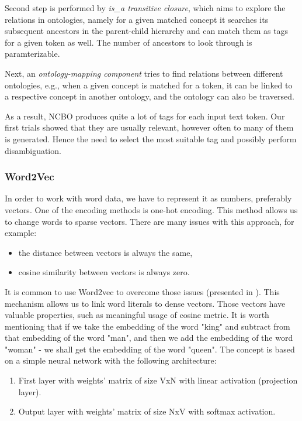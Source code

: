 \documentclass[11pt]{article}
\begin{document}
Second step is performed by \textit{is\_a transitive closure}, which aims to explore the relations in ontologies, namely for a given matched concept it searches its subsequent ancestors in the parent-child hierarchy and can match them as tags for a given token as well. The number of ancestors to look through is paramterizable. 

Next, an \textit{ontology-mapping component} tries to find relations between different ontologies, e.g., when a given concept is matched for a token, it can be linked to a respective concept in another ontology, and the ontology can also be traversed. 

As a result, NCBO produces quite a lot of tags for each input text token. Our first trials showed that they are usually relevant, however often to many of them is generated. Hence the need to select the most suitable tag and possibly perform disambiguation.
\subsubsection{Word2Vec}

In order to work with word data, we have to represent it as numbers, preferably vectors. One of the encoding methods is one-hot encoding. This method allows us to change words to sparse vectors. There are many issues with this approach, for example: 
\begin{itemize}
    \item the distance between vectors is always the same,
    \item cosine similarity between vectors is always zero.
\end{itemize}


It is common to use Word2vec to overcome those issues (presented in \cite{Word2vec}). This mechanism allows us to link word literals to dense vectors. Those vectors have valuable properties, such as meaningful usage of cosine metric. It is worth mentioning that if we take the embedding of the word "king" and subtract from that embedding of the word "man", and then we add the embedding of the word "woman" - we shall get the embedding of the word "queen". 
The concept is based on a simple neural network with the following architecture: 
\begin{enumerate}
    \item First layer with weights' matrix of size  VxN with linear activation (projection layer).
    \item Output layer with weights' matrix of size NxV with softmax activation. 
\end{enumerate}
\end{document}
